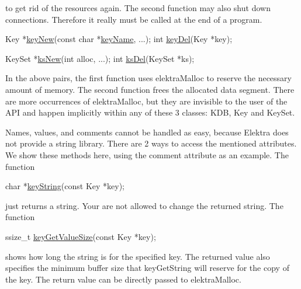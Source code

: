 to get rid of the resources again. The second function may also shut down connections. Therefore it really must be called at the end of a program.


\begin{DoxyCode}
Key *\hyperlink{group__key_gad23c65b44bf48d773759e1f9a4d43b89}{keyNew}(\textcolor{keyword}{const} \textcolor{keywordtype}{char} *\hyperlink{group__keyname_ga8e805c726a60da921d3736cda7813513}{keyName}, ...);
\textcolor{keywordtype}{int} \hyperlink{group__key_ga3df95bbc2494e3e6703ece5639be5bb1}{keyDel}(Key *key);

KeySet *\hyperlink{group__keyset_ga671e1aaee3ae9dc13b4834a4ddbd2c3c}{ksNew}(\textcolor{keywordtype}{int} alloc, ...);
\textcolor{keywordtype}{int} \hyperlink{group__keyset_ga27e5c16473b02a422238c8d970db7ac8}{ksDel}(KeySet *ks);
\end{DoxyCode}


In the above pairs, the first function uses {\ttfamily elektra\+Malloc} to reserve the necessary amount of memory. The second function frees the allocated data segment. There are more occurrences of {\ttfamily elektra\+Malloc}, but they are invisible to the user of the A\+PI and happen implicitly within any of these 3 classes\+: {\ttfamily K\+DB}, {\ttfamily Key} and {\ttfamily Key\+Set}.

Names, values, and comments cannot be handled as easy, because Elektra does not provide a string library. There are 2 ways to access the mentioned attributes. We show these methods here, using the comment attribute as an example. The function


\begin{DoxyCode}
\textcolor{keywordtype}{char} *\hyperlink{group__keyvalue_ga880936f2481d28e6e2acbe7486a21d05}{keyString}(\textcolor{keyword}{const} Key *key);
\end{DoxyCode}


just returns a string. Your are not allowed to change the returned string. The function


\begin{DoxyCode}
ssize\_t \hyperlink{group__keyvalue_gae326672fffb7474abfe9baf53b73217e}{keyGetValueSize}(\textcolor{keyword}{const} Key *key);
\end{DoxyCode}


shows how long the string is for the specified key. The returned value also specifies the minimum buffer size that {\ttfamily key\+Get\+String} will reserve for the copy of the key. The return value can be directly passed to {\ttfamily elektra\+Malloc}.


